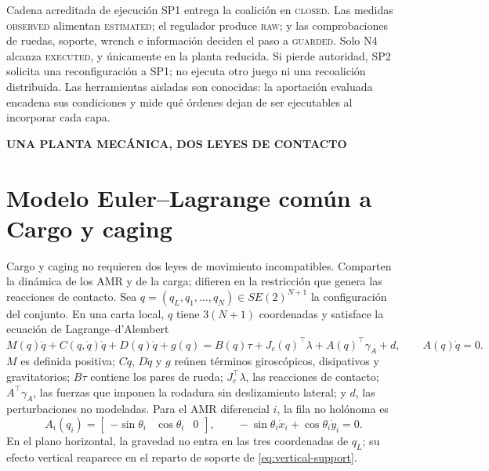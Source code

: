 \documentclass[12pt,a4paper]{article}
\newcommand{\leveltag}[1]{%
  \Needspace{5.5\baselineskip}%
  \noindent\colorbox{VIUDark}{%
    \parbox{\dimexpr\textwidth-2\fboxsep\relax}{%
      \color{white}\sffamily\bfseries\small #1%
    }%
  }\par\smallskip
}
\begin{document}
\begin{contribucion}{Cadena acreditada de ejecución}
SP1 entrega la coalición en \textsc{closed}. Las medidas \textsc{observed}
alimentan \textsc{estimated}; el regulador produce \textsc{raw}; y las
comprobaciones de ruedas, soporte, wrench e información deciden el paso a
\textsc{guarded}. Solo N4 alcanza \textsc{executed}, y únicamente en la planta
reducida. Si pierde autoridad, SP2 solicita una reconfiguración a SP1; no ejecuta
otro juego ni una recoalición distribuida. Las herramientas aisladas son
conocidas: la aportación evaluada encadena sus condiciones y mide qué órdenes
dejan de ser ejecutables al incorporar cada capa.
\end{contribucion}

\clearpage
\leveltag{UNA PLANTA MECÁNICA, DOS LEYES DE CONTACTO}
\section*{Modelo Euler--Lagrange común a Cargo y caging}

Cargo y caging no requieren dos leyes de movimiento incompatibles. Comparten la
dinámica de los AMR y de la carga; difieren en la restricción que genera las
reacciones de contacto. Sea
$q=(q_L,q_1,\ldots,q_N)\in SE(2)^{N+1}$ la configuración del conjunto. En una
carta local, $q$ tiene $3(N+1)$ coordenadas y satisface la ecuación de
Lagrange--d'Alembert
\begin{equation}
M(q)\ddot q+C(q,\dot q)\dot q+D(q)\dot q+g(q)
=B(q)\tau+J_c(q)^\top\lambda+A(q)^\top\gamma_A+d,
\qquad A(q)\dot q=0 .
\label{eq:sp2-unified-el}
\end{equation}
$M$ es definida positiva; $C\dot q$, $D\dot q$ y $g$ reúnen términos
giroscópicos, disipativos y gravitatorios; $B\tau$ contiene los pares de rueda;
$J_c^\top\lambda$, las reacciones de contacto; $A^\top\gamma_A$, las fuerzas que
imponen la rodadura sin deslizamiento lateral; y $d$, las perturbaciones no
modeladas. Para el AMR diferencial $i$, la fila no holónoma es
\begin{equation}
A_i(q_i)=\begin{bmatrix}-\sin\theta_i&\cos\theta_i&0\end{bmatrix},
\qquad -\sin\theta_i\dot x_i+\cos\theta_i\dot y_i=0.
\label{eq:sp2-nonholonomic-row}
\end{equation}
En el plano horizontal, la gravedad no entra en las tres coordenadas de
$q_L$; su efecto vertical reaparece en el reparto de soporte de
\eqref{eq:vertical-support}.
\end{document}
